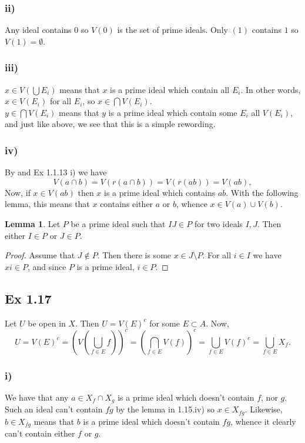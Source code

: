 \documentclass{article}
\theoremstyle{definition}
\newtheorem{lemma}[theorem]{Lemma}
\begin{document}
\subsubsection*{ii)}
Any ideal contains $0$ so $V(0)$ is the set of prime ideals. Only $(1)$
contains $1$ so $V(1) = \emptyset$.

\subsubsection*{iii)}
$x \in V(\bigcup E_i)$ means that $x$ is a prime ideal which contain all $E_i$.
In other words, $x \in V(E_i)$ for all $E_i$, so $ x \in \bigcap V(E_i)$. \\

$y \in \bigcap V(E_i)$ means that $y$ is a prime ideal which contain some $E_i$
all $V(E_i)$, and just like above, we see that this is a simple rewording. \\

\subsubsection*{iv)}
By and Ex 1.1.13 i) we have
$$
	V(a \cap b) = V(r(a \cap b)) = V(r(ab)) = V(ab),
$$
Now, if $x \in V(ab)$ then $x$ is a prime ideal which contains $ab$. With the
following lemma, this means that $x$ contains either $a$ or $b$, whence $x \in
V(a) \cup V(b)$.

\begin{lemma}
	Let $P$ be a prime ideal such that $IJ \in P$ for two ideals $I, J$. Then
	either $I \in P$ or $J \in P$.
\end{lemma}
\begin{proof}
	Assume that $J \not \in P$. Then there is some $x \in J \setminus P$. For all
	$i \in I$ we have $xi \in P$, and since $P$ is a prime ideal, $i \in P$.
\end{proof}

\subsection*{Ex 1.17}

Let $U$ be open in $X$. Then $U=V(E)^c$ for some $E \subset A$. Now, $$ U =
	V(E)^c = \left(V\left(\bigcup_{f \in E}f\right)\right)^c = \left(\bigcap_{f \in
		E} V(f)\right)^c = \bigcup_{f \in E} V(f)^c = \bigcup_{f \in E} X_f. $$

\subsubsection*{i)}
We have that any $a \in X_f \cap X_g$ is a prime ideal which doesn't contain $f$, nor $g$. Such an ideal can't contain $fg$ by the lemma in 1.15.iv) so $x \in X_{fg}$. Likewise, $b \in X_{fg}$ means that $b$ is a prime ideal which doesn't contain $fg$, whence it clearly can't contain either $f$ or $g$.
\end{document}
